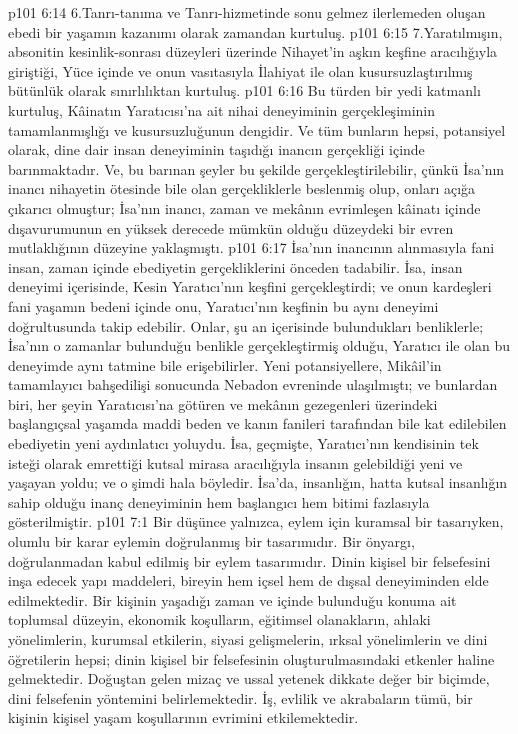 \vs p101 6:14 6.Tanrı\hyp{}tanıma ve Tanrı\hyp{}hizmetinde sonu gelmez ilerlemeden oluşan ebedi bir yaşamın kazanımı olarak zamandan kurtuluş.
\vs p101 6:15 7.\bibnobreakspace Yaratılmışın, absonitin kesinlik\hyp{}sonrası düzeyleri üzerinde Nihayet’in aşkın keşfine aracılığıyla giriştiği, Yüce içinde ve onun vasıtasıyla İlahiyat ile olan kusursuzlaştırılmış bütünlük olarak sınırlılıktan kurtuluş.
\vs p101 6:16 Bu türden bir yedi katmanlı kurtuluş, Kâinatın Yaratıcısı’na ait nihai deneyiminin gerçekleşiminin tamamlanmışlığı ve kusursuzluğunun dengidir. Ve tüm bunların hepsi, potansiyel olarak, dine dair insan deneyiminin taşıdığı inancın gerçekliği içinde barınmaktadır. Ve, bu barınan şeyler bu şekilde gerçekleştirilebilir, çünkü İsa’nın inancı nihayetin ötesinde bile olan gerçekliklerle beslenmiş olup, onları açığa çıkarıcı olmuştur; İsa’nın inancı, zaman ve mekânın evrimleşen kâinatı içinde dışavurumunun en yüksek derecede mümkün olduğu düzeydeki bir evren mutlaklığının düzeyine yaklaşmıştı.
\vs p101 6:17 İsa’nın inancının alınmasıyla fani insan, zaman içinde ebediyetin gerçekliklerini önceden tadabilir. İsa, insan deneyimi içerisinde, Kesin Yaratıcı’nın keşfini gerçekleştirdi; ve onun kardeşleri fani yaşamın bedeni içinde onu, Yaratıcı’nın keşfinin bu aynı deneyimi doğrultusunda takip edebilir. Onlar, şu an içerisinde bulundukları benliklerle; İsa’nın o zamanlar bulunduğu benlikle gerçekleştirmiş olduğu, Yaratıcı ile olan bu deneyimde aynı tatmine bile erişebilirler. Yeni potansiyellere, Mikâil’in tamamlayıcı bahşedilişi sonucunda Nebadon evreninde ulaşılmıştı; ve bunlardan biri, her şeyin Yaratıcısı’na götüren ve mekânın gezegenleri üzerindeki başlangıçsal yaşamda maddi beden ve kanın fanileri tarafından bile kat edilebilen ebediyetin yeni aydınlatıcı yoluydu. İsa, geçmişte, Yaratıcı’nın kendisinin tek isteği olarak emrettiği kutsal mirasa aracılığıyla insanın gelebildiği yeni ve yaşayan yoldu; ve o şimdi hala böyledir. İsa’da, insanlığın, hatta kutsal insanlığın sahip olduğu inanç deneyiminin hem başlangıcı hem bitimi fazlasıyla gösterilmiştir.
\vs p101 7:1 Bir düşünce yalnızca, eylem için kuramsal bir tasarıyken, olumlu bir karar eylemin doğrulanmış bir tasarımıdır. Bir önyargı, doğrulanmadan kabul edilmiş bir eylem tasarımıdır. Dinin kişisel bir felsefesini inşa edecek yapı maddeleri, bireyin hem içsel hem de dışsal deneyiminden elde edilmektedir. Bir kişinin yaşadığı zaman ve içinde bulunduğu konuma ait toplumsal düzeyin, ekonomik koşulların, eğitimsel olanakların, ahlaki yönelimlerin, kurumsal etkilerin, siyasi gelişmelerin, ırksal yönelimlerin ve dini öğretilerin hepsi; dinin kişisel bir felsefesinin oluşturulmasındaki etkenler haline gelmektedir. Doğuştan gelen mizaç ve ussal yetenek dikkate değer bir biçimde, dini felsefenin yöntemini belirlemektedir. İş, evlilik ve akrabaların tümü, bir kişinin kişisel yaşam koşullarının evrimini etkilemektedir.
